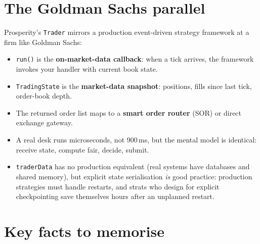 \section{The Goldman Sachs parallel}
\label{sec:gs_parallel}

\begin{gsbox}
Prosperity's \texttt{Trader} mirrors a production event-driven strategy
framework at a firm like Goldman Sachs:

\begin{itemize}
  \item \texttt{run()} is the \textbf{on-market-data callback}: when a
  tick arrives, the framework invokes your handler with current book
  state.
  \item \texttt{TradingState} is the \textbf{market-data snapshot}:
  positions, fills since last tick, order-book depth.
  \item The returned order list maps to a \textbf{smart order router}
  (SOR) or direct exchange gateway.
  \item A real desk runs microseconds, not 900\,ms, but the mental
  model is identical: receive state, compute fair, decide, submit.
  \item \texttt{traderData} has no production equivalent (real systems
  have databases and shared memory), but explicit state serialisation
  \emph{is} good practice: production strategies must handle restarts,
  and strats who design for explicit checkpointing save themselves
  hours after an unplanned restart.
\end{itemize}
\end{gsbox}

\section{Key facts to memorise}
\label{sec:prosperity_keyfacts}

